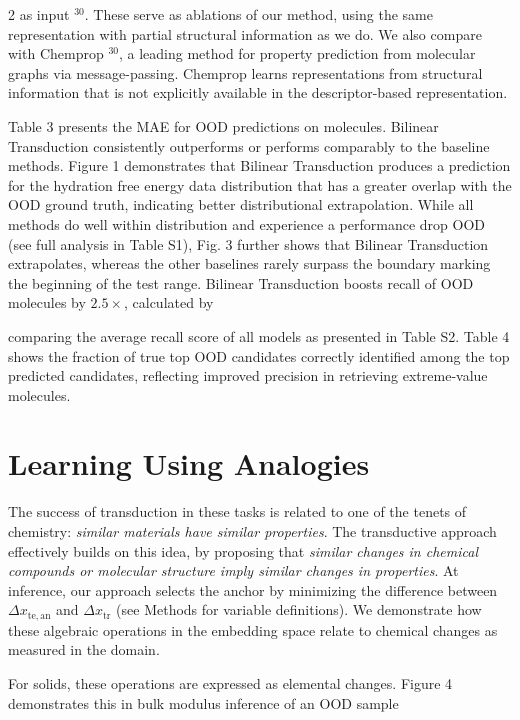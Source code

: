 \documentclass[10pt]{article}
\begin{document}
\vspace{0.8em}
\begin{multicols}{2}
\footnotesize
as input $^{30}$. These serve as ablations of our method, using the same representation with partial structural information as we do. We also compare with Chemprop $^{30}$, a leading method for property prediction from molecular graphs via message-passing. Chemprop learns representations from structural information that is not explicitly available in the descriptor-based representation.

Table 3 presents the MAE for OOD predictions on molecules. Bilinear Transduction consistently outperforms or performs comparably to the baseline methods. Figure 1 demonstrates that Bilinear Transduction produces a prediction for the hydration free energy data distribution that has a greater overlap with the OOD ground truth, indicating better distributional extrapolation. While all methods do well within distribution and experience a performance drop OOD (see full analysis in Table S1), Fig. 3 further shows that Bilinear Transduction extrapolates, whereas the other baselines rarely surpass the boundary marking the beginning of the test range. Bilinear Transduction boosts recall of OOD molecules by $2.5 \times$, calculated by

comparing the average recall score of all models as presented in Table S2. Table 4 shows the fraction of true top OOD candidates correctly identified among the top predicted candidates, reflecting improved precision in retrieving extreme-value molecules.

\section*{Learning Using Analogies}
The success of transduction in these tasks is related to one of the tenets of chemistry: \textit{similar materials have similar properties}. The transductive approach effectively builds on this idea, by proposing that \textit{similar changes in chemical compounds or molecular structure imply similar changes in properties}. At inference, our approach selects the anchor by minimizing the difference between $\Delta x_{\mathrm{te,an}}$ and $\Delta x_{\mathrm{tr}}$ (see Methods for variable definitions). We demonstrate how these algebraic operations in the embedding space relate to chemical changes as measured in the domain.

For solids, these operations are expressed as elemental changes. Figure 4 demonstrates this in bulk modulus inference of an OOD sample
\end{multicols}
\end{document}
